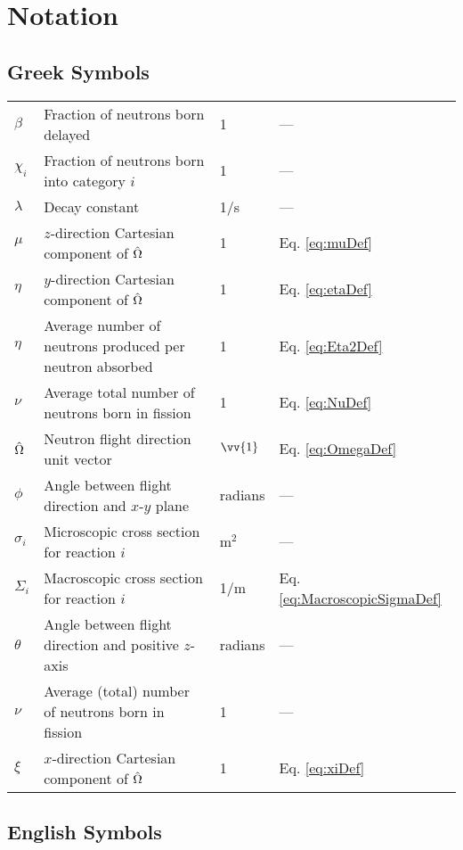 \section{Notation}

\subsection{Greek Symbols}

\begin{tabular}{l l l l}
\(\beta\) & Fraction of neutrons born delayed & 1 & ---\\
\(\chi_i\) & Fraction of neutrons born into category \(i\) & 1 & ---\\
\(\lambda\) & Decay constant & 1/s & ---\\
\(\mu\) & \(z\)-direction Cartesian component of \(\hat{\Omega}\) & 1 & Eq. \eqref{eq:muDef}\\
\(\eta\) & \(y\)-direction Cartesian component of \(\hat{\Omega}\) & 1 & Eq. \eqref{eq:etaDef}\\
\(\eta\) & Average number of neutrons produced per neutron absorbed & 1 & Eq. \eqref{eq:Eta2Def}\\
\(\nu\) & Average total number of neutrons born in fission & 1 & Eq. \eqref{eq:NuDef}\\
\(\hat{\Omega}\) & Neutron flight direction unit vector & \(\vv{1}\) & Eq. \eqref{eq:OmegaDef}\\
\(\phi\) & Angle between flight direction and \(x\)-\(y\) plane & radians & ---\\
\(\sigma_i\) & Microscopic cross section for reaction \(i\) & m$^2$ & ---\\
\(\Sigma_i\) & Macroscopic cross section for reaction \(i\) & 1/m & Eq. \eqref{eq:MacroscopicSigmaDef}\\
\(\theta\) & Angle between flight direction and positive \(z\)-axis & radians & ---\\
\(\nu\) & Average (total) number of neutrons born in fission & 1 & ---\\
\(\xi\) & \(x\)-direction Cartesian component of \(\hat{\Omega}\) & 1 & Eq. \eqref{eq:xiDef}\\
\end{tabular}

\subsection{English Symbols}

